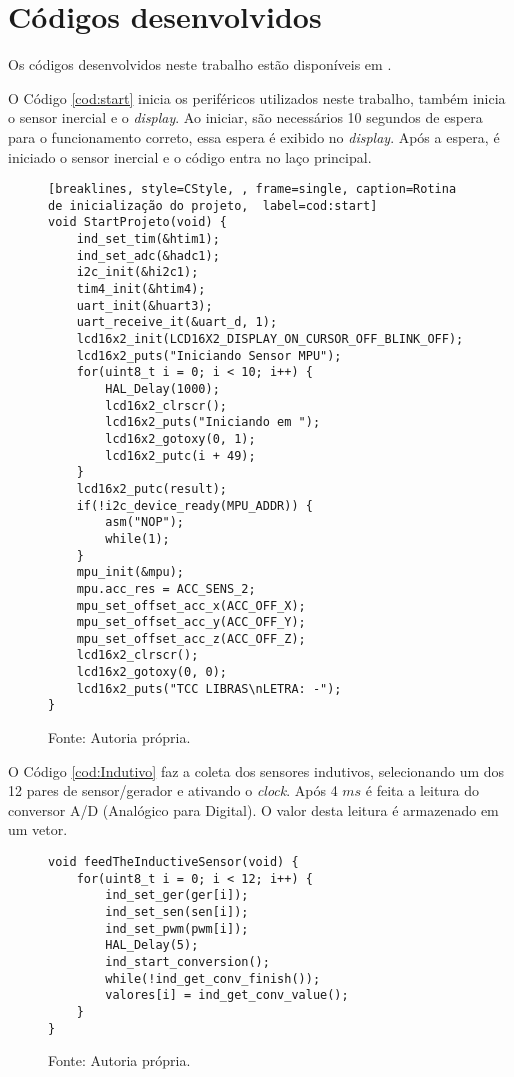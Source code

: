 \chapter{Códigos desenvolvidos}
	Os códigos desenvolvidos neste trabalho estão disponíveis em .
	
	O Código \ref{cod:start} inicia os periféricos utilizados neste trabalho, também inicia o sensor inercial e o \textit{display}. Ao iniciar, são necessários 10 segundos de espera para o funcionamento correto, essa espera é exibido no \textit{display}. Após a espera, é iniciado o sensor inercial e o código entra no laço principal.
\begin{figure}[H]
	\begin{lstlisting}[breaklines, style=CStyle, , frame=single, caption=Rotina de inicialização do projeto,  label=cod:start]
void StartProjeto(void) {
	ind_set_tim(&htim1);
	ind_set_adc(&hadc1);
	i2c_init(&hi2c1);
	tim4_init(&htim4);
	uart_init(&huart3);
	uart_receive_it(&uart_d, 1);
	lcd16x2_init(LCD16X2_DISPLAY_ON_CURSOR_OFF_BLINK_OFF);
	lcd16x2_puts("Iniciando Sensor MPU");
	for(uint8_t i = 0; i < 10; i++) {
		HAL_Delay(1000);
		lcd16x2_clrscr();
		lcd16x2_puts("Iniciando em ");
		lcd16x2_gotoxy(0, 1);
		lcd16x2_putc(i + 49);
	}	
	lcd16x2_putc(result);
	if(!i2c_device_ready(MPU_ADDR)) {
		asm("NOP");
		while(1);
	}	
	mpu_init(&mpu);
	mpu.acc_res = ACC_SENS_2;
	mpu_set_offset_acc_x(ACC_OFF_X);
	mpu_set_offset_acc_y(ACC_OFF_Y);
	mpu_set_offset_acc_z(ACC_OFF_Z);
	lcd16x2_clrscr();
	lcd16x2_gotoxy(0, 0);
	lcd16x2_puts("TCC LIBRAS\nLETRA: -");
}
	\end{lstlisting}
	\caption*{Fonte: Autoria própria.}
\end{figure}
	
	O Código \ref{cod:Indutivo} faz a coleta dos sensores indutivos, selecionando um dos 12 pares de sensor/gerador e ativando o \textit{clock}. Após 4 $ms$ é feita a leitura do conversor A/D (Analógico para Digital). O valor desta leitura é armazenado em um vetor.
\begin{figure}[H]
\begin{lstlisting}[style=CStyle, breaklines, frame=single, caption=Rotina de coleta de dados do sensor indutivo,  label=cod:Indutivo]
void feedTheInductiveSensor(void) {
	for(uint8_t i = 0; i < 12; i++) {
		ind_set_ger(ger[i]);
		ind_set_sen(sen[i]);
		ind_set_pwm(pwm[i]);
		HAL_Delay(5);
		ind_start_conversion();
		while(!ind_get_conv_finish());
		valores[i] = ind_get_conv_value();
	}
}
\end{lstlisting}
\caption*{Fonte: Autoria própria.}
\end{figure}

